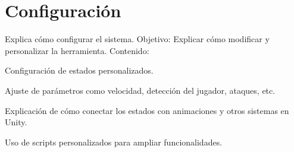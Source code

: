 \section{Configuración}
Explica cómo configurar el sistema.
Objetivo: Explicar cómo modificar y personalizar la herramienta.
 Contenido:

Configuración de estados personalizados.

Ajuste de parámetros como velocidad, detección del jugador, ataques, etc.

Explicación de cómo conectar los estados con animaciones y otros sistemas en Unity.

Uso de scripts personalizados para ampliar funcionalidades.

